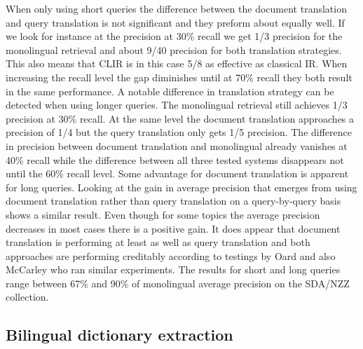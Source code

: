 \documentclass[journal]{IEEEtran}
\begin{document}
When only using short queries the difference between the document translation and query translation is not significant and they preform about equally well.
If we look for instance at the precision at 30\% recall we get 1/3 precision for the monolingual retrieval and about 9/40 precision for both translation strategies.
This also means that CLIR is in this case 5/8 as effective as classical IR.
When increasing the recall level the gap diminishes until at 70\% recall they both result in the same performance.
A notable difference in translation strategy can be detected when using longer queries.
The monolingual retrieval still achieves 1/3 precision at 30\% recall.
At the same level the document translation approaches a precision of 1/4 but the query translation only gets 1/5 precision.
The difference in precision between document translation and monolingual already vanishes at 40\% recall while the difference between all three tested systems disappears not until the 60\% recall level.
Some advantage for document translation is apparent for long queries.
Looking at the gain in average precision that emerges from using document translation rather than query translation on a query-by-query basis shows a similar result.
Even though for some topics the average precision decreases in most cases there is a positive gain.
It does appear that document translation is performing at least as well as query translation and both approaches are performing creditably according to testings by Oard \cite{oard97b} and also McCarley \cite{mccarley99} who ran similar experiments.
The results for short and long queries range between 67\% and 90\% of monolingual average precision on the SDA/NZZ collection.


\subsection{Bilingual dictionary extraction}
\cite{yu09}
\end{document}
